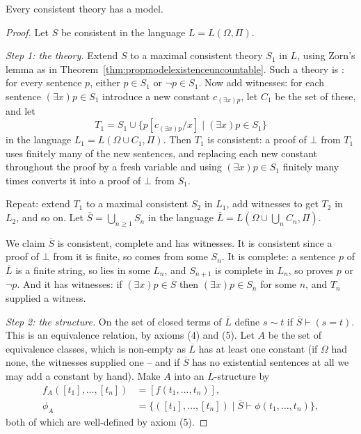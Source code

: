 \begin{theorem}\label{thm:predmodelexistence}
  Every consistent theory has a model.
\end{theorem}
\begin{proof}
  Let $S$ be consistent in the language $L = L(\Omega, \Pi)$.

  \emph{Step 1: the theory.} Extend $S$ to a maximal consistent theory $S_1$ in $L$, using Zorn's lemma as in Theorem~\ref{thm:propmodelexistenceuncountable}. Such a theory is : for every sentence $p$, either $p \in S_1$ or $\lnot p \in S_1$. Now add witnesses: for each sentence $(\exists x) p \in S_1$ introduce a new constant $c_{(\exists x)p}$, let $C_1$ be the set of these, and let
  $$T_1 = S_1 \cup \{p[c_{(\exists x)p}/x] \mid (\exists x)p \in S_1\}$$
  in the language $L_1 = L(\Omega \cup C_1, \Pi)$. Then $T_1$ is consistent: a proof of $\bot$ from $T_1$ uses finitely many of the new sentences, and replacing each new constant throughout the proof by a fresh variable and using $(\exists x)p \in S_1$ finitely many times converts it into a proof of $\bot$ from $S_1$.

  Repeat: extend $T_1$ to a maximal consistent $S_2$ in $L_1$, add witnesses to get $T_2$ in $L_2$, and so on. Let $\overline{S} = \bigcup_{n \geq 1} S_n$ in the language $\overline{L} = L(\Omega \cup \bigcup_n C_n, \Pi)$.

  We claim $\overline S$ is consistent, complete and has witnesses. It is consistent since a proof of $\bot$ from it is finite, so comes from some $S_n$. It is complete: a sentence $p$ of $\overline L$ is a finite string, so lies in some $L_n$, and $S_{n+1}$ is complete in $L_n$, so proves $p$ or $\lnot p$. And it has witnesses: if $(\exists x) p \in \overline S$ then $(\exists x)p \in S_n$ for some $n$, and $T_n$ supplied a witness.

  \emph{Step 2: the structure.} On the set of closed terms of $\overline L$ define $s \sim t$ if $\overline S \vdash (s = t)$. This is an equivalence relation, by axioms (4) and (5). Let $A$ be the set of equivalence classes, which is non-empty as $\overline L$ has at least one constant (if $\Omega$ had none, the witnesses supplied one -- and if $\overline S$ has no existential sentences at all we may add a constant by hand). Make $A$ into an $\overline L$-structure by
  \begin{align*}
    f_A([t_1], \dots, [t_n]) &= [f(t_1, \dots, t_n)], \\
    \phi_A &= \{([t_1], \dots, [t_n]) \mid \overline S \vdash \phi(t_1, \dots, t_n)\},
  \end{align*}
  both of which are well-defined by axiom (5).


\end{proof}
